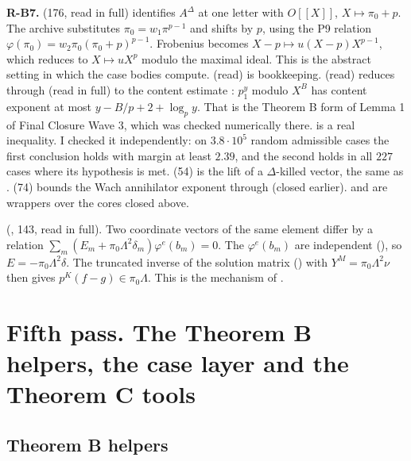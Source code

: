 \documentclass[11pt]{article}
\theoremstyle{definition}
\theoremstyle{remark}
\begin{document}
\noindent\textbf{R-B7.}  (176, read in full) identifies $A^\Delta$ at one letter with $O[[X]]$, $X\mapsto\pi_0+p$. The archive substitutes $\pi_0=w_1\pi^{p-1}$ and shifts by $p$, using the P9 relation $\varphi(\pi_0)=w_2\pi_0(\pi_0+p)^{p-1}$. Frobenius becomes $X-p\mapsto u(X-p)X^{p-1}$, which reduces to $X\mapsto uX^p$ modulo the maximal ideal. This is the abstract  setting in which the case bodies compute.  (read) is bookkeeping.  (read) reduces through  (read in full) to the content estimate : $p_1^y$ modulo $X^B$ has content exponent at most $y-B/p+2+\log_py$. That is the Theorem B form of Lemma 1 of Final Closure Wave 3, which was checked numerically there.  is a real inequality. I checked it independently: on $3.8\cdot10^5$ random admissible cases the first conclusion holds with margin at least $2.39$, and the second holds in all $227$ cases where its hypothesis is met.  (54) is the lift of a $\Delta$-killed vector, the same as .  (74) bounds the Wach annihilator exponent through  (closed earlier).  and  are wrappers over the cores closed above.

\noindent\textbf{} (, 143, read in full). Two coordinate vectors of the same element differ by a relation $\sum_m(E_m+\pi_0\Lambda^2\delta_m)\varphi^e(b_m)=0$. The $\varphi^e(b_m)$ are independent (), so $E=-\pi_0\Lambda^2\delta$. The truncated inverse of the solution matrix () with $Y^M=\pi_0\Lambda^2\nu$ then gives $p^K(f-g)\in\pi_0\Lambda$. This is the mechanism of .

\section{Fifth pass. The Theorem B helpers, the case layer and the Theorem C tools}\label{sec:fifth}

\subsection*{Theorem B helpers}
\end{document}
